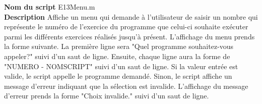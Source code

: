 \textbf{Nom du script}
E13Menu.m\\
\textbf{Description}
Affiche un menu qui demande à l'utilisateur de saisir un nombre qui représente le numéro de l'exercice du programme que celui-ci souhaite exécuter parmi les différents exercices réalisés jusqu'à présent. L'affichage du menu prends la forme suivante. La première ligne sera "Quel programme souhaitez-vous appeler?" suivi d'un saut de ligne. Ensuite, chaque ligne aura la forme de "NUMERO - NOMSCRIPT" suivi d'un saut de ligne. Si la valeur entrée est valide, le script appelle le programme demandé. Sinon, le script affiche un message d'erreur indiquant que la sélection est invalide. L'affichage du message d'erreur prends la forme "Choix invalide." suivi d'un saut de ligne.